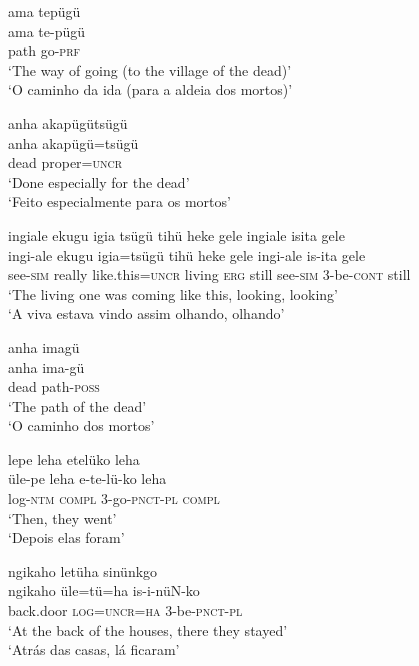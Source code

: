 \documentclass[output=paper,
modfonts,nonflat
]{langsci/langscibook}
\begin{document}
\ea ama tepügü \\[.3em]
\gll ama	te-pügü \\
path 	go-\textsc{prf} \\
\glt ‘The way of going (to the village of the dead)’ \\
‘O caminho da ida (para a aldeia dos mortos)’ \\
\z

\ea anha akapügütsügü \\[.3em]
\gll anha	akapügü=tsügü \\
dead 	proper=\textsc{uncr} \\
\glt ‘Done especially for the dead’ \\
‘Feito especialmente para os mortos’ \\
\z

\ea ingiale ekugu igia tsügü tihü heke gele ingiale isita gele\\[.3em]
\gll ingi-ale	ekugu	igia=tsügü tihü	heke	gele	ingi-ale	is-ita gele\\ 
see-\textsc{sim} 	really 	like.this=\textsc{uncr} living \textsc{erg} 	still 	see-\textsc{sim} 	3-be\textsc{-cont} still\\ 
\glt ‘The living one was coming like this, looking, looking’\\
‘A viva estava vindo assim olhando, olhando’{\footnotemark}\\
\z 

\ea anha imagü \\[.3em]
\gll anha ima-gü \\
dead path-\textsc{poss} \\
\glt ‘The path of the dead’ \\
‘O caminho dos mortos’ \\
\z

\ea lepe leha etelüko leha \\[.3em]
\gll üle-pe		leha		e-te-lü-ko		leha \\
log-\textsc{ntm}	\textsc{compl} 	3-go-\textsc{pnct-pl}	\textsc{compl} \\
\glt ‘Then, they went’ \\
‘Depois elas foram’ \\
\z

\ea ngikaho letüha sinünkgo \\[.3em]
\gll ngikaho	üle=tü=ha	is-i-nüN-ko \\
back.door	\textsc{log=uncr=ha}	3-be-\textsc{pnct-pl} \\
\glt ‘At the back of the houses, there they stayed’ \\
‘Atrás das casas, lá ficaram’ \\
\z
\end{document}
